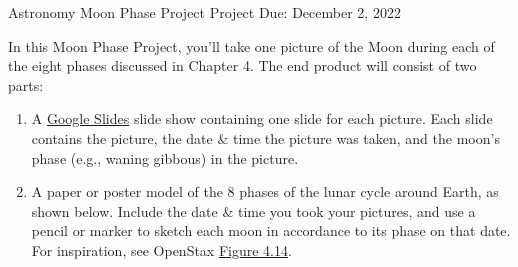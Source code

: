 \documentclass{article}
\begin{document}
\def\moonR{15pt}
\def\moonD{2cm}

Astronomy \hfill Moon Phase Project \hfill Project Due: December 2, 2022
\vspace{1em}

In this Moon Phase Project, you'll take one picture of the Moon during each of the eight phases discussed in Chapter 4. The end product will consist of two parts:

\begin{enumerate}
\setlength\itemsep{0ex}
    \item A \href{https://www.google.com/slides/about/}{Google Slides} slide show containing one slide for each picture. Each slide contains the picture, the date \& time the picture was taken, and the moon's phase (e.g., waning gibbous) in the picture.
    \item A paper or poster model of the 8 phases of the lunar cycle around Earth, as shown below. Include the date \& time you took your pictures, and use a pencil or marker to sketch each moon in accordance to its phase on that date. For inspiration, see OpenStax \href{https://openstax.org/books/astronomy-2e/pages/4-5-phases-and-motions-of-the-moon#OSC_Astro_04_05_Moon}{Figure 4.14}.
\end{enumerate}



\begin{figure}[h!]
    \centering
{}
\end{figure}
\end{document}
